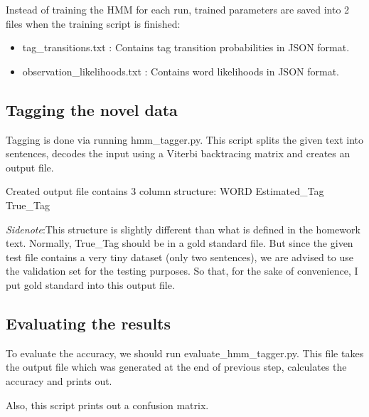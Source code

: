 \documentclass[twocolumn,preprintnumbers,amsmath,amssymb,superscriptaddress,pre]{revtex4}
\theoremstyle{plain}%
\theoremstyle{definition}
\theoremstyle{remark}
\begin{document}
Instead of training the HMM for each run, trained parameters are saved into 2 files when the training script is finished:
 \begin{itemize}[itemsep=0mm]
  \item tag\_transitions.txt : Contains tag transition probabilities in JSON format.
  \item observation\_likelihoods.txt : Contains word likelihoods in JSON format.
\end{itemize} 

 \subsection{Tagging the novel data}
 Tagging is done via running hmm\_tagger.py. This script splits the given text into sentences, decodes the input
 using a Viterbi backtracing matrix and creates an output file. 
 
 Created output file contains 3 column structure:
 WORD  Estimated\_Tag  True\_Tag
 
 \textit{Sidenote}:This structure is slightly different than what is defined in the homework text. Normally, True\_Tag should be 
 in a gold standard file. But since the given test file contains a very tiny dataset (only two sentences), 
 we are advised to use the validation  set for the testing purposes. So that, for the sake of convenience, 
 I put gold standard into this output file.
 
 
  \subsection{Evaluating the results} 
To evaluate the accuracy, we should run evaluate\_hmm\_tagger.py. This file takes the output file which was generated at the 
end of previous step, calculates the accuracy and prints out. 

Also, this script prints out a confusion matrix.
 
 
 

\end{document}
